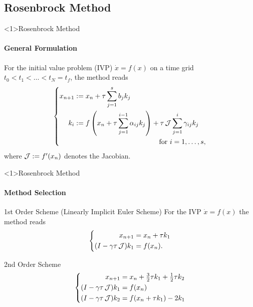 \subsection{Rosenbrock Method}

\begin{frame}<1>{Rosenbrock Method}
\framesubtitle{General Formulation}
\begin{bigpicturecols}
    For the initial value problem (IVP) $\dot x = f(x)$
    on a time grid $t_0 < t_1 < \ldots < t_N = t_f$,
    the method reads
    \begin{equation*}
    \left\{
    \begin{aligned}
      x_{n+1} &:= x_n + \tau \sum_{j=1}^s b_j k_j
      \\
      k_i &:= \begin{multlined}[t]
      f\left( x_n + \tau \sum_{j=1}^{i-1} \alpha_{ij} k_j \right) + \tau \Jac \sum_{j=1}^i \gamma_{ij} k_j
      \\
      \text{for } i = 1, \ldots, s
      ,
      \end{multlined}
    \end{aligned}
    \right.
    \end{equation*}
    where $\operatorname{\mathcal J} := f'(x_n)$ denotes the Jacobian.
\column{\bigpicturewidth}
\end{bigpicturecols}
\end{frame}

\begin{frame}<1>{Rosenbrock Method}
\framesubtitle{Method Selection}
\begin{bigpicturecols}
  \begin{block}{1st Order Scheme (Linearly Implicit Euler Scheme)}
    For the IVP $\dot x = f(x)$ the method reads
    \begin{equation*}
    \left\{
    \begin{aligned}
      x_{n+1} &= x_n + \tau k_1 \\
      (I - \gamma\tau \operatorname{\mathcal J}) k_1 &= f(x_n)
      .
    \end{aligned}
    \right.
    \end{equation*}
  \end{block}
  \begin{block}{2nd Order Scheme \parencite{Verwer1999}}
    \begin{equation*}
    \left\{
    \begin{aligned}
      x_{n+1} &= x_n + \tfrac{3}{2} \tau k_1 + \tfrac{1}{2} \tau k_2 \\
      (I - \gamma\tau \operatorname{\mathcal J}) k_1 &= f(x_n) \\
      (I - \gamma\tau \operatorname{\mathcal J}) k_2 &= f(x_n + \tau k_1) - 2k_1
    \end{aligned}
    \right.
    \end{equation*}
  \end{block}
\column{\bigpicturewidth}
\end{bigpicturecols}
\end{frame}

